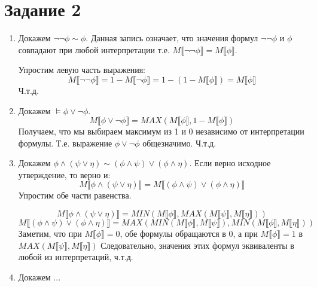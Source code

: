 \documentclass{article}
\begin{document}
\section*{Задание 2}
\begin{enumerate}
    \item
        Докажем \(\neg \neg \phi \sim \phi\). Данная запись означает, 
        что значения формул \(\neg \neg \phi\) и \(\phi\) совпадают при любой интерпретации 
        т.е. \(M\llbracket \neg \neg \phi\rrbracket = M\llbracket\phi\rrbracket\).

        Упростим левую часть выражения:
        \[
            M\llbracket\neg \neg \phi \rrbracket
            = 1 - M\llbracket \neg \phi \rrbracket
            = 1 - (1 - M\llbracket\phi\rrbracket)
            = M\llbracket\phi\rrbracket
        \]
        Ч.т.д.
    \item
        Докажем \(\models \phi \lor \neg \phi\).
        \[
            M\llbracket \phi \lor \neg \phi \rrbracket
            = MAX(M\llbracket \phi \rrbracket, 1 - M\llbracket \phi \rrbracket)
        \]
        Получаем, что мы выбираем максимум из 1 и 0 независимо от интерпретации формулы. 
        Т.е. выражение \(\phi \lor \neg \phi\) общезначимо. Ч.т.д.
    \item
        Докажем \(\phi \land (\psi \lor \eta) \sim (\phi \land \psi) \lor (\phi \land \eta)\).
        Если верно исходное утверждение, то верно и:
        \[M \llbracket \phi \land (\psi \lor \eta) \rrbracket = M \llbracket (\phi \land \psi) \lor (\phi \land \eta) \rrbracket\]
        Упростим обе части равенства.

        \[
            M \llbracket \phi \land (\psi \lor \eta) \rrbracket 
            = MIN(M \llbracket \phi \rrbracket, MAX(M \llbracket \psi \rrbracket, M \llbracket \eta \rrbracket))
        \]
        \[
            M \llbracket (\phi \land \psi) \lor (\phi \land \eta) \rrbracket
            = MAX(MIN(M \llbracket \phi \rrbracket, M \llbracket \psi \rrbracket), MIN(M \llbracket \phi \rrbracket, M \llbracket \eta \rrbracket))
        \]
        Заметим, что при \(M \llbracket \phi \rrbracket = 0\), обе формулы обращаются в 0, 
        а при \(M \llbracket \phi \rrbracket = 1\) в \(MAX(M \llbracket \psi \rrbracket, M \llbracket \eta \rrbracket)\)
        Следовательно, значения этих формул эквиваленты в любой из интерпретаций, ч.т.д.
    \item Докажем ...
\end{enumerate}
\end{document}
